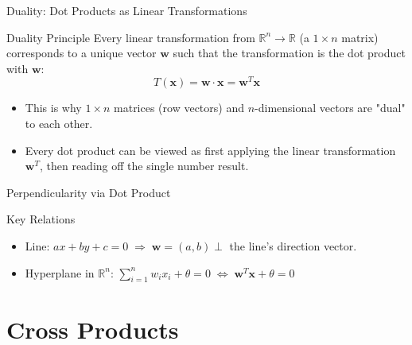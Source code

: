 \documentclass[9pt,aspectratio=169]{beamer}
\newcommand{\R}{\mathbb{R}}
\newcommand{\vect}[1]{\mathbf{#1}}
\begin{document}
\begin{frame}{Duality: Dot Products as Linear Transformations}
\begin{block}{Duality Principle}
Every linear transformation from $\R^n \to \R$ (a $1\times n$ matrix) corresponds to a unique vector $\vect{w}$ such that the transformation is the dot product with $\vect{w}$:
$$T(\vect{x}) = \vect{w}\cdot \vect{x} = \vect{w}^T \vect{x}$$
\end{block}
\begin{itemize}
\item This is why $1\times n$ matrices (row vectors) and $n$-dimensional vectors are "dual" to each other.
\item Every dot product can be viewed as first applying the linear transformation $\vect{w}^T$, then reading off the single number result.
\end{itemize}
\end{frame}

\begin{frame}{Perpendicularity via Dot Product}
\centering
{}
\begin{block}{Key Relations}
\begin{itemize}
\item Line: $ax+by+c=0 \;\Rightarrow\; \vect{w}=(a,b) \perp$ the line's direction vector.
\item Hyperplane in $\R^n$: $\displaystyle\sum_{i=1}^n w_ix_i + \theta = 0 \;\Leftrightarrow\; \vect{w}^T\vect{x}+\theta = 0$
\end{itemize}
\end{block}
\end{frame}

\section{Cross Products}
\end{document}

